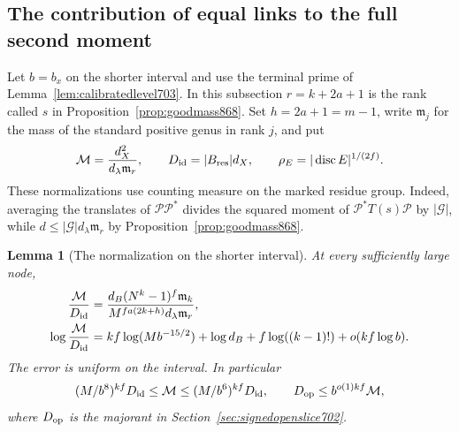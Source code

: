 \documentclass[a4paper,11pt]{article}
\newtheorem{lemma}[proposition]{Lemma}
\theoremstyle{definition}
\theoremstyle{remark}
\numberwithin{equation}{section}
\begin{document}
\subsection{The contribution of equal links to the full second moment}
\label{sec:equallinks869}

Let \(b=b_x\) on the shorter interval and use the terminal prime of
Lemma~\ref{lem:calibratedlevel703}. In this subsection \(r=k+2a+1\)
is the rank called \(s\) in Proposition~\ref{prop:goodmass868}.
Set \(h=2a+1=m-1\), write \(\mathfrak m_j\) for the mass of the
standard positive genus in rank \(j\), and put
\[
 \mathcal M=\frac{d_X^2}{d_\lambda\mathfrak m_r},\qquad
 D_{\rm id}=|B_{\rm res}|d_X,\qquad \rho_E=|\operatorname{disc}E|^{1/(2f)}.
\]
These normalizations use counting measure on the marked residue group.
Indeed, averaging the translates of \(\mathcal P\mathcal P^*\) divides
the squared moment of \(\mathcal P^*T(s)\mathcal P\) by
\(|\mathcal G|\), while
\(d\le|\mathcal G|d_\lambda\mathfrak m_r\) by
Proposition~\ref{prop:goodmass868}.

\begin{lemma}[The normalization on the shorter interval]\leavevmode
\label{lem:massscale869}
At every sufficiently large node,
\begin{align}
 \frac{\mathcal M}{D_{\rm id}}
 &= \frac{d_B (N^k-1)^f\mathfrak m_k}
          {M^{fa(2k+h)}d_\lambda\mathfrak m_r},
 \label{eq:massscale869}\\
 \log\frac{\mathcal M}{D_{\rm id}}
 &= kf\log(M b^{-15/2})+\log d_B+f\log((k-1)!)
       +o(kf\log b).
 \label{eq:masslog869}
\end{align}
The error is uniform on the interval. In particular
\[
  (M/b^8)^{kf}D_{\rm id}\le\mathcal M
          \le (M/b^6)^{kf}D_{\rm id},\qquad
  D_{\rm op}\le b^{o(1)kf}\mathcal M ,
\]
where \(D_{\rm op}\) is the majorant in
Section~\ref{sec:signedopenslice702}.
\end{lemma}
\end{document}
